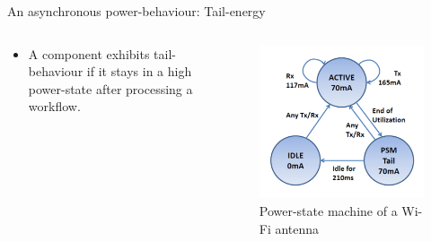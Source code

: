 %
\begin{frame}{An asynchronous power-behaviour: Tail-energy}
\begin{columns}
\begin{column}{0.5\textwidth}
\begin{definition}
\begin{itemize}
\item A component exhibits \alert{tail-behaviour} if it stays in a high power-state \alert{after} processing a workflow.
\end{itemize}
\end{definition}
\end{column}

\begin{column}{0.5\textwidth}
\begin{figure}
	\centering
	\includegraphics[width=\textwidth]{figures/wifi_statemachine.png} 
	\caption{Power-state machine of a Wi-Fi antenna}
\end{figure}
\end{column}
\end{columns}
\end{frame}
